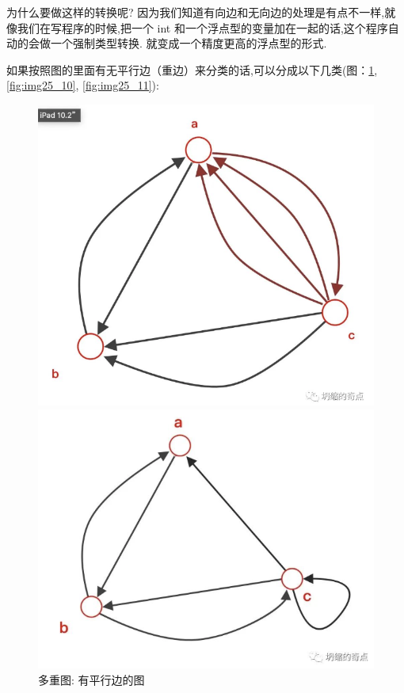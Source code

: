 为什么要做这样的转换呢? 因为我们知道有向边和无向边的处理是有点不一样,就像我们在写程序的时候,把一个 int 和一个浮点型的变量加在一起的话,这个程序自动的会做一个强制类型转换. 就变成一个精度更高的浮点型的形式. 

如果按照图的里面有无平行边（重边）来分类的话,可以分成以下几类(图：\ref{fig:img25_9}, \ref{fig:img25_10}, \ref{fig:img25_11}): 

\begin{figure}[ht]
  \centering
  \begin{minipage}[t]{0.3\textwidth}
    \includegraphics[width=\textwidth]{asset/20231227145235.png}
    \caption{多重图: 有平行边的图}
    \label{fig:img25_9}
  \end{minipage}%
  \hspace{0.5em}
  \begin{minipage}[t]{0.3\textwidth}
    \includegraphics[width=\textwidth]{asset/20231227145249.png}

\end{minipage}
\end{figure}
